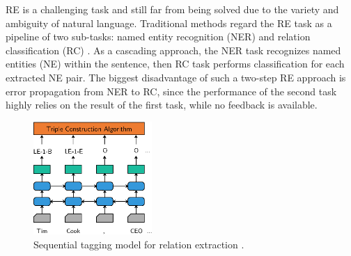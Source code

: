 RE is a challenging task and still far from being solved due to the 
variety and ambiguity of natural language. 
Traditional methods regard the RE task as a pipeline of two sub-tasks:
named entity recognition (NER) \cite{zhou2002named,Nadeau2007,Dernoncourt2017} and 
relation classification (RC)
\cite{Zeng2014,Wang2016,Wen2017,Cai2016,Zhou2016,Xu2015}. 
As a cascading approach, the NER task recognizes named entities (NE)
within the sentence, then RC task performs classification for each extracted NE pair.
The biggest disadvantage of such a two-step RE approach is error propagation
from NER to RC, since the performance of the second task highly relies on 
the result of the first task, while no feedback is available.

\begin{figure}[th]
\centering
\includegraphics[width=4.5cm]{pictures/model.eps}
\caption{Sequential tagging model for relation extraction \cite{Zheng2017}. \label{fig:model}}
\end{figure}

